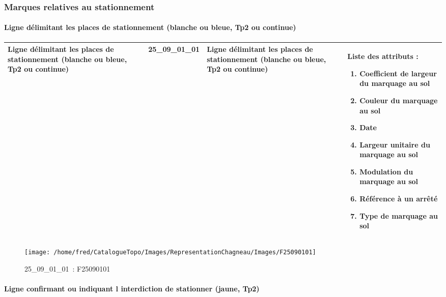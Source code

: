 \documentclass[12pt,titlepage,oneside]{book}
\begin{document}
\subsubsection{\large Marques relatives au stationnement}
\paragraph{Ligne délimitant les places de stationnement (blanche ou bleue, Tp2 ou continue)}
\noindent
\vspace{\baselineskip}

\renewcommand{\arraystretch}{1.2}
\begin{supertabular}{|p{10cm}|c|p{13cm}|p{12cm}|}
 Ligne délimitant les places de stationnement (blanche ou bleue, Tp2 ou continue) & 25\_09\_01\_01 & Ligne délimitant les places de stationnement (blanche ou bleue, Tp2 ou continue) & Liste des attributs :
\begin{enumerate}
  \item Coefficient de largeur du marquage au sol  \item Couleur du marquage au sol  \item Date  \item Largeur unitaire du marquage au sol  \item Modulation du marquage au sol  \item Référence à un arrêté  \item Type de marquage au sol\end{enumerate}
\\
\hline
\end{supertabular}
\begin{figure}[h!]
  \hfill         %
  \begin{minipage}[t]{3cm}
    \begin{center}
      \texttt{[image: /home/fred/CatalogueTopo/Images/RepresentationChagneau/Images/F25090101]}
      \caption[~25\_09\_01\_01]{\small{25\_09\_01\_01~:} \tiny{F25090101}}\label{F25090101}
    \end{center}
  \end{minipage}
\end{figure}


\paragraph{Ligne confirmant ou indiquant l interdiction de stationner (jaune, Tp2)}
\noindent
\vspace{\baselineskip}
\end{document}
